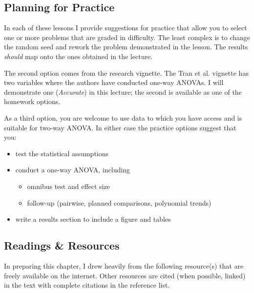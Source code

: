 \documentclass[
  11pt,
]{book}
\providecommand{\tightlist}{%
  \setlength{\itemsep}{0pt}\setlength{\parskip}{0pt}}
\begin{document}
\hypertarget{planning-for-practice-4}{%
\subsection{Planning for Practice}\label{planning-for-practice-4}}

In each of these lessons I provide suggestions for practice that allow you to select one or more problems that are graded in difficulty. The least complex is to change the random seed and rework the problem demonstrated in the lesson. The results \emph{should} map onto the ones obtained in the lecture.

The second option comes from the research vignette. The Tran et al. \citeyearpar{tran_you_2014} vignette has two variables where the authors have conducted one-way ANOVAs. I will demonstrate one (\emph{Accurate}) in this lecture; the second is available as one of the homework options.

As a third option, you are welcome to use data to which you have access and is suitable for two-way ANOVA. In either case the practice options suggest that you:

\begin{itemize}
\tightlist
\item
  test the statistical assumptions
\item
  conduct a one-way ANOVA, including

  \begin{itemize}
  \tightlist
  \item
    omnibus test and effect size
  \item
    follow-up (pairwise, planned comparisons, polynomial trends)
  \end{itemize}
\item
  write a results section to include a figure and tables
\end{itemize}

\hypertarget{readings-resources-4}{%
\subsection{Readings \& Resources}\label{readings-resources-4}}

In preparing this chapter, I drew heavily from the following resource(s) that are freely available on the internet. Other resources are cited (when possible, linked) in the text with complete citations in the reference list.
\end{document}
